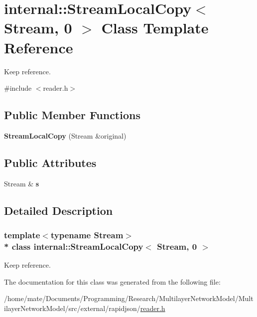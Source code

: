 \hypertarget{classinternal_1_1StreamLocalCopy_3_01Stream_00_010_01_4}{}\section{internal\+:\+:Stream\+Local\+Copy$<$ Stream, 0 $>$ Class Template Reference}
\label{classinternal_1_1StreamLocalCopy_3_01Stream_00_010_01_4}


Keep reference.  




{\ttfamily \#include $<$reader.\+h$>$}

\subsection*{Public Member Functions}
\begin{DoxyCompactItemize}
\item 
{\bfseries Stream\+Local\+Copy} (Stream \&original)\hypertarget{classinternal_1_1StreamLocalCopy_3_01Stream_00_010_01_4_ac684a7be07d79d6ddd274dc1150f4b79}{}\label{classinternal_1_1StreamLocalCopy_3_01Stream_00_010_01_4_ac684a7be07d79d6ddd274dc1150f4b79}

\end{DoxyCompactItemize}
\subsection*{Public Attributes}
\begin{DoxyCompactItemize}
\item 
Stream \& {\bfseries s}\hypertarget{classinternal_1_1StreamLocalCopy_3_01Stream_00_010_01_4_ad31147888384f4bd51eabc2d7acdc4b6}{}\label{classinternal_1_1StreamLocalCopy_3_01Stream_00_010_01_4_ad31147888384f4bd51eabc2d7acdc4b6}

\end{DoxyCompactItemize}


\subsection{Detailed Description}
\subsubsection*{template$<$typename Stream$>$\\*
class internal\+::\+Stream\+Local\+Copy$<$ Stream, 0 $>$}

Keep reference. 

The documentation for this class was generated from the following file\+:\begin{DoxyCompactItemize}
\item 
/home/mate/\+Documents/\+Programming/\+Research/\+Multilayer\+Network\+Model/\+Multilayer\+Network\+Model/src/external/rapidjson/\hyperlink{reader_8h}{reader.\+h}\end{DoxyCompactItemize}
